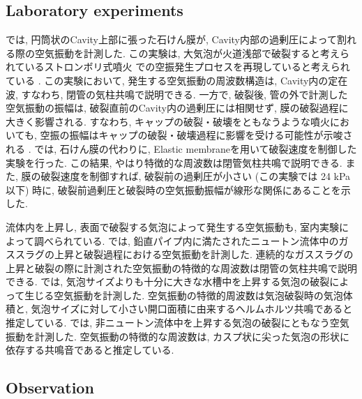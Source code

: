 \documentclass[12pt]{article}
\begin{document}
\subsection{Laboratory experiments}\label{AcoinEx}
\cite{Vidal2006a}では, 円筒状のCavity上部に張った石けん膜が, Cavity内部の過剰圧によって割れる際の空気振動を計測した. 
この実験は, 大気泡が火道浅部で破裂すると考えられているストロンボリ式噴火 \citep{Chouet1974, BLACKBURN1976, Vergniolle1996c}での空振発生プロセスを再現していると考えられている \citep{Vidal2010a, Gerst2013a}. 
この実験において, 発生する空気振動の周波数構造は, Cavity内の定在波, すなわち, 閉管の気柱共鳴で説明できる. 一方で, 破裂後, 管の外で計測した空気振動の振幅は, 破裂直前のCavity内の過剰圧には相関せず, 膜の破裂過程に大きく影響される. すなわち, キャップの破裂・破壊をともなうような噴火においても, 空振の振幅はキャップの破裂・破壊過程に影響を受ける可能性が示唆される \citep{Vidal2010a}. \cite{Sanchez2014}では, 石けん膜の代わりに, Elastic membraneを用いて破裂速度を制御した実験を行った. この結果, やはり特徴的な周波数は閉管気柱共鳴で説明できる. また, 膜の破裂速度を制御すれば, 破裂前の過剰圧が小さい (この実験では 24 kPa以下) 時に, 破裂前過剰圧と破裂時の空気振動振幅が線形な関係にあることを示した. 

流体内を上昇し, 表面で破裂する気泡によって発生する空気振動も, 室内実験によって調べられている.
\cite{James2004}では, 鉛直パイプ内に満たされたニュートン流体中のガススラグの上昇と破裂過程における空気振動を計測した. 連続的なガススラグの上昇と破裂の際に計測された空気振動の特徴的な周波数は閉管の気柱共鳴で説明できる. 
\cite{Spiel1992}では, 気泡サイズよりも十分に大きな水槽中を上昇する気泡の破裂によって生じる空気振動を計測した. 空気振動の特徴的周波数は気泡破裂時の気泡体積と, 気泡サイズに対して小さい開口面積に由来するヘルムホルツ共鳴であると推定している.
\cite{Divoux2008}では, 非ニュートン流体中を上昇する気泡の破裂にともなう空気振動を計測した. 空気振動の特徴的な周波数は, カスプ状に尖った気泡の形状に依存する共鳴音であると推定している.


\subsection{Observation}\label{AcoinObs}
\end{document}
